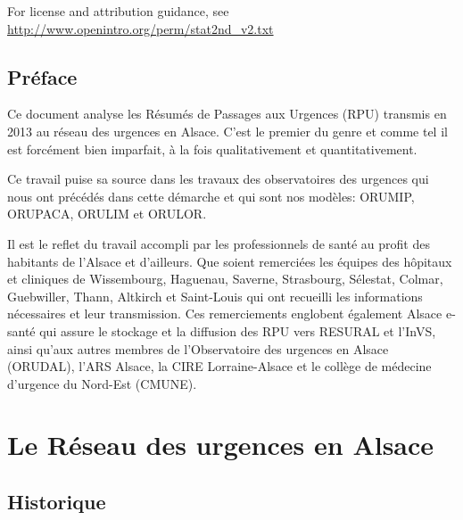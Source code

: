 \documentclass[12pt,english,french,twoside]{book}\usepackage[]{graphicx}\usepackage[]{color}
\begin{document}
\noindent For license and attribution guidance, see \url{http://www.openintro.org/perm/stat2nd_v2.txt}

\mainmatter

\tableofcontents
\listoftables
\listoffigures




\chapter*{Préface}


Ce document analyse les Résumés de Passages aux Urgences (RPU) transmis en 2013 au réseau des urgences en Alsace. C'est le premier du genre et comme tel il est forcément bien imparfait, à la fois qualitativement et quantitativement.

Ce travail puise sa source dans les travaux des observatoires des urgences qui nous ont précédés dans cette démarche et qui sont nos modèles: ORUMIP, ORUPACA, ORULIM et ORULOR.

Il est le reflet du travail accompli par les professionnels de santé au profit des habitants de l'Alsace et d'ailleurs. Que soient remerciées les équipes des hôpitaux et cliniques de Wissembourg, Haguenau, Saverne, Strasbourg, Sélestat, Colmar, Guebwiller, Thann, Altkirch et Saint-Louis qui ont recueilli les informations nécessaires et leur transmission. Ces remerciements englobent également Alsace e-santé qui assure le stockage et la diffusion des RPU vers RESURAL et l'InVS, ainsi qu'aux autres membres de l'Observatoire des urgences en Alsace (ORUDAL), l'ARS Alsace, la CIRE Lorraine-Alsace et le collège de médecine d'urgence du Nord-Est (CMUNE).


\part{Le Réseau des urgences en Alsace}

\chapter{Historique}
\end{document}
